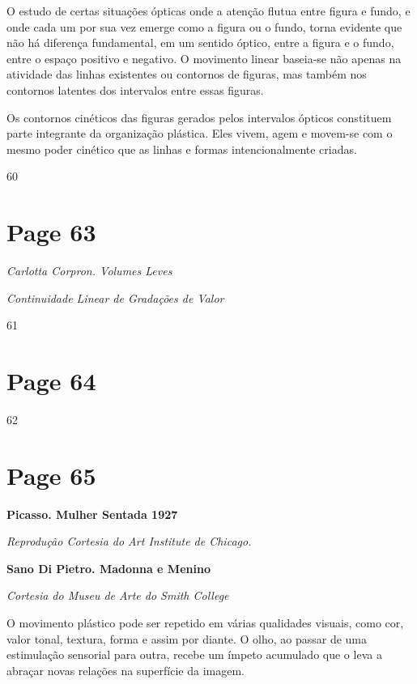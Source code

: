 \documentclass[a4paper]{article}
\begin{document}
O estudo de certas situações ópticas onde a atenção flutua entre figura e fundo, e onde cada um por sua vez emerge como a figura ou o fundo, torna evidente que não há diferença fundamental, em um sentido óptico, entre a figura e o fundo, entre o espaço positivo e negativo. O movimento linear baseia-se não apenas na atividade das linhas existentes ou contornos de figuras, mas também nos contornos latentes dos intervalos entre essas figuras.

Os contornos cinéticos das figuras gerados pelos intervalos ópticos constituem parte integrante da organização plástica. Eles vivem, agem e movem-se com o mesmo poder cinético que as linhas e formas intencionalmente criadas.

60

\newpage
\section*{Page 63}

\noindent\textit{Carlotta Corpron. Volumes Leves}\par
\noindent\textit{Continuidade Linear de Gradações de Valor}\par
\par %
\centerline{61}

\newpage
\section*{Page 64}

62

\newpage
\section*{Page 65}

\textbf{Picasso. Mulher Sentada 1927}

\textit{Reprodução Cortesia do Art Institute de Chicago.}

\bigskip

\textbf{Sano Di Pietro. Madonna e Menino}

\textit{Cortesia do Museu de Arte do Smith College}

\bigskip

O movimento plástico pode ser repetido em várias qualidades visuais, como cor, valor tonal, textura, forma e assim por diante. O olho, ao passar de uma estimulação sensorial para outra, recebe um ímpeto acumulado que o leva a abraçar novas relações na superfície da imagem.
\end{document}
